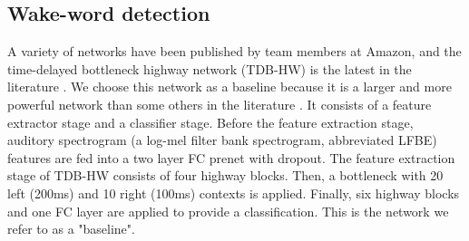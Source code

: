 \documentclass{article}
\begin{document}
\subsection{Wake-word detection}
A variety of networks have been published by team members at Amazon, and the time-delayed bottleneck highway network (TDB-HW) is the latest in the literature \cite{amazon_HW}. %
We choose this network as a baseline because it is a larger and more powerful network than some others in the literature \cite{tinyml_from}.
It consists of a feature extractor stage and a classifier stage.
Before the feature extraction stage, auditory spectrogram (a log-mel filter bank spectrogram, abbreviated LFBE) features are fed into a two layer FC prenet with dropout. %
The feature extraction stage of TDB-HW consists of four highway blocks.
Then, a bottleneck with 20 left (200ms) and 10 right (100ms) contexts is applied.
Finally, six highway blocks and one FC layer are applied to provide a classification.
This is the network we refer to as a "baseline".

\end{document}
